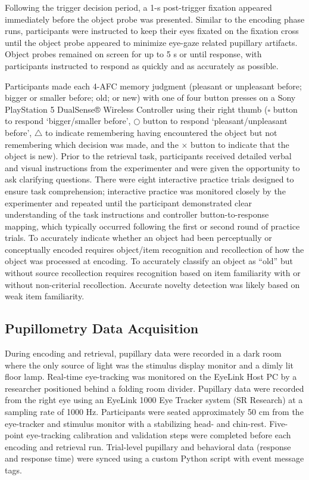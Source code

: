 Following the trigger decision period, a 1-s post-trigger fixation appeared immediately before the object probe was presented. Similar to the encoding phase runs, participants were instructed to keep their eyes fixated on the fixation cross until the object probe appeared to minimize eye-gaze related pupillary artifacts. Object probes remained on screen for up to 5 s or until response, with participants instructed to respond as quickly and as accurately as possible. 

Participants made each 4-AFC memory judgment (pleasant or unpleasant before; bigger or smaller before; old; or new) with one of four button presses on a Sony PlayStation 5 DualSense® Wireless Controller using their right thumb ($\square$ button to respond `bigger/smaller before', $\bigcirc$ button to respond `pleasant/unpleasant before', $\triangle$ to indicate remembering having encountered the object but not remembering which decision was made, and the $\times$ button to indicate that the object is new). Prior to the retrieval task, participants received detailed verbal and visual instructions from the experimenter and were given the opportunity to ask clarifying questions. There were eight interactive practice trials designed to ensure task comprehension; interactive practice was monitored closely by the experimenter and repeated until the participant demonstrated clear understanding of the task instructions and controller button-to-response mapping, which typically occurred following the first or second round of practice trials. To accurately indicate whether an object had been perceptually or conceptually encoded requires object/item recognition and recollection of how the object was processed at encoding. To accurately classify an object as ``old'' but without source recollection requires recognition based on item familiarity with or without non-criterial recollection. Accurate novelty detection was likely based on weak item familiarity.

\subsection{Pupillometry Data Acquisition}

During encoding and retrieval, pupillary data were recorded in a dark room where the only source of light was the stimulus display monitor and a dimly lit floor lamp. Real-time eye-tracking was monitored on the EyeLink Host PC by a researcher positioned behind a folding room divider. Pupillary data were recorded from the right eye using an EyeLink 1000 Eye Tracker system (SR Research) at a sampling rate of 1000 Hz. Participants were seated approximately 50 cm from the eye-tracker and stimulus monitor with a stabilizing head- and chin-rest. Five-point eye-tracking calibration and validation steps were completed before each encoding and retrieval run. Trial-level pupillary and behavioral data (response and response time) were synced using a custom Python script with event message tags.

